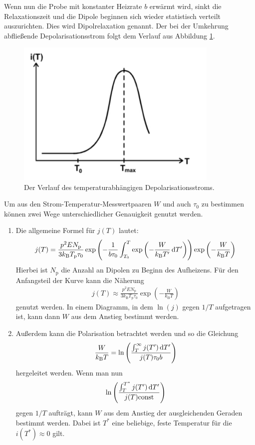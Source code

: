 Wenn nun die Probe mit konstanter Heizrate $b$ erwärmt wird, sinkt die Relaxationszeit und die Dipole beginnen sich wieder statistisch verteilt auszurichten. Dies wird Dipolrelaxation genannt. Der bei der Umkehrung abfließende Depolarisationsstrom folgt dem Verlauf aus Abbildung \ref{fig:stromTemp}.
\begin{figure}
  \centering
  \includegraphics[height= 7cm]{BestNippelpiercings/stromTemp.pdf}
  \caption{Der Verlauf des temperaturabhängigen Depolarisationsstroms. \cite{anleitung}}
  \label{fig:stromTemp}
\end{figure}
Um aus den Strom-Temperatur-Messwertpaaren $W$ und auch $\tau_0$ zu bestimmen können zwei Wege unterschiedlicher Genauigkeit genutzt werden.
\begin{enumerate}
  \item Die allgemeine Formel für $j(T)$ lautet:
    \begin{align}
      j(T) = \frac{p^2 E N_\text{p}}{3k_\text{B} T_\text{p}\tau_0}
      \exp\left(-\frac{1}{b\tau_0} \int_{T_0}^T\exp\left(-\frac{W}{k_\text{B}T'}\mathop{}\!\mathrm{d} T'\right)\right)
      \exp\left(-\frac{W}{k_\text{B}T}\right) \label{eqn:allgjt}
    \end{align}
    Hierbei ist $N_\text{p}$ die Anzahl an Dipolen zu Beginn des Aufheizens.
    Für den Anfangsteil der Kurve kann die Näherung
    \begin{align}
      j(T) \approx \frac{p^2 E N_\text{p}}{3k_\text{B} T_\text{p}\tau_0} \exp\left(-\frac{W}{k_\text{B}T}\right)
      \label{eqn:W1formel}
    \end{align}
    genutzt werden. In einem Diagramm, in dem $\ln(j)$ gegen $1/T$ aufgetragen ist, kann dann $W$ aus dem Anstieg bestimmt werden.
  \item Außerdem kann die Polarisation betrachtet werden und so die Gleichung
    \begin{align}
      \frac{W}{k_\text{B}T} = \ln\left(\frac{\int_{T}^{\infty} j(T')\mathop{}\!\mathrm{d} T'}{j(T)\tau_0 b}\right)
      \label{eqn:W2formel}
    \end{align}
    hergeleitet werden. Wenn man nun
    \begin{align*}
      \ln\left(\frac{\int_T^{T^*} j(T')\mathop{}\!\mathrm{d} T'}{j(T) \text{const}}\right)
    \end{align*}
    gegen $1/T$ aufträgt, kann $W$ aus dem Anstieg der ausgleichenden Geraden bestimmt werden. Dabei ist $T^*$ eine beliebige, feste Temperatur für die $i(T^*) \approx 0$ gilt.
\end{enumerate}
